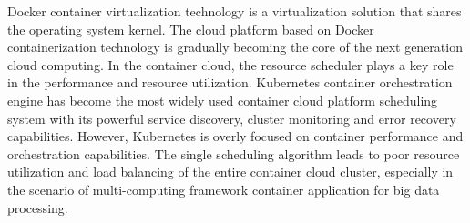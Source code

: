 \begin{eabstract}
Docker container virtualization technology is a virtualization solution that shares the operating system kernel. The cloud platform based on Docker containerization technology is gradually becoming the core of the next generation cloud computing. In the container cloud, the resource scheduler plays a key role in the performance and resource utilization. Kubernetes container orchestration engine has become the most widely used container cloud platform scheduling system with its powerful service discovery, cluster monitoring and error recovery capabilities. However, Kubernetes is overly focused on container performance and orchestration capabilities. The single scheduling algorithm leads to poor resource utilization and load balancing of the entire container cloud cluster, especially in the scenario of multi-computing framework container application for big data processing.


\end{eabstract}
